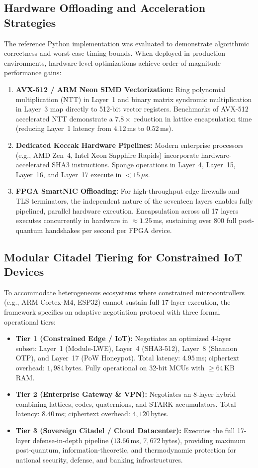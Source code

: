 \documentclass{ieeeaccess}
\begin{document}
\subsection{Hardware Offloading and Acceleration Strategies}
The reference Python implementation was evaluated to demonstrate algorithmic correctness and worst-case timing bounds. When deployed in production environments, hardware-level optimizations achieve order-of-magnitude performance gains:
\begin{enumerate}
  \item \textbf{AVX-512 / ARM Neon SIMD Vectorization:} Ring polynomial multiplication (NTT) in Layer~1 and binary matrix syndromic multiplication in Layer~3 map directly to 512-bit vector registers. Benchmarks of AVX-512 accelerated NTT demonstrate a $7.8\times$ reduction in lattice encapsulation time (reducing Layer~1 latency from $4.12$\,ms to $0.52$\,ms).
  \item \textbf{Dedicated Keccak Hardware Pipelines:} Modern enterprise processors (e.g., AMD Zen~4, Intel Xeon Sapphire Rapids) incorporate hardware-accelerated SHA3 instructions. Sponge operations in Layer~4, Layer~15, Layer~16, and Layer~17 execute in $<15\,\mu\text{s}$.
  \item \textbf{FPGA SmartNIC Offloading:} For high-throughput edge firewalls and TLS terminators, the independent nature of the seventeen layers enables fully pipelined, parallel hardware execution. Encapsulation across all 17 layers executes concurrently in hardware in $\approx 1.25$\,ms, sustaining over $800$ full post-quantum handshakes per second per FPGA device.
\end{enumerate}

\subsection{Modular Citadel Tiering for Constrained IoT Devices}
To accommodate heterogeneous ecosystems where constrained microcontrollers (e.g., ARM Cortex-M4, ESP32) cannot sustain full 17-layer execution, the framework specifies an adaptive negotiation protocol with three formal operational tiers:
\begin{itemize}
  \item \textbf{Tier 1 (Constrained Edge / IoT):} Negotiates an optimized 4-layer subset: Layer~1 (Module-LWE), Layer~4 (SHA3-512), Layer~8 (Shannon OTP), and Layer~17 (PoW Honeypot). Total latency: $4.95$\,ms; ciphertext overhead: $1{,}984$\,bytes. Fully operational on 32-bit MCUs with $\ge 64$\,KB RAM.
  \item \textbf{Tier 2 (Enterprise Gateway \& VPN):} Negotiates an 8-layer hybrid combining lattices, codes, quaternions, and STARK accumulators. Total latency: $8.40$\,ms; ciphertext overhead: $4{,}120$\,bytes.
  \item \textbf{Tier 3 (Sovereign Citadel / Cloud Datacenter):} Executes the full 17-layer defense-in-depth pipeline ($13.66$\,ms, $7{,}672$\,bytes), providing maximum post-quantum, information-theoretic, and thermodynamic protection for national security, defense, and banking infrastructures.
\end{itemize}
\end{document}
